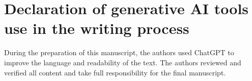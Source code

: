 \documentclass[a4paper,fleqn]{cas-sc}
\begin{document}

\printcredits

\section*{Declaration of generative AI tools use in the writing process}
During the preparation of this manuscript, the authors used ChatGPT to improve the language and readability of the text. The authors reviewed and verified all content and take full responsibility for the final manuscript.



\end{document}
